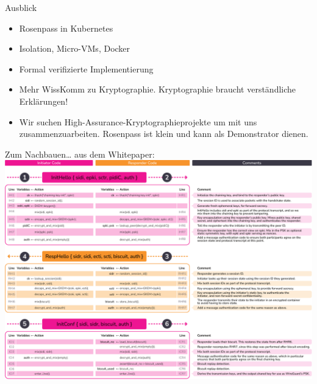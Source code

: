 \documentclass{rosenpass-beamer}
\begin{document}
\begin{frame}{Ausblick}
  \begin{itemize}
    \item Rosenpass in Kubernetes
    \item Isolation, Micro-VMs, Docker
    \item Formal verifizierte Implementierung
  \end{itemize}
  \begin{itemize}
    \item Mehr WissKomm zu Kryptographie. Kryptographie braucht verständliche Erklärungen!
  \end{itemize}
  \begin{itemize}
    \item Wir suchen High-Assurance-Kryptographieprojekte um mit uns zusammenzuarbeiten. Rosenpass ist klein und kann als Demonstrator dienen.
  \end{itemize}
\end{frame}

\begin{frame}{Zum Nachbauen… aus dem Whitepaper:}
  \includegraphics[height=.9\textheight]{graphics/rosenpass-wp-message-handling-code.pdf}
\end{frame}


\maketitle

\end{document}
